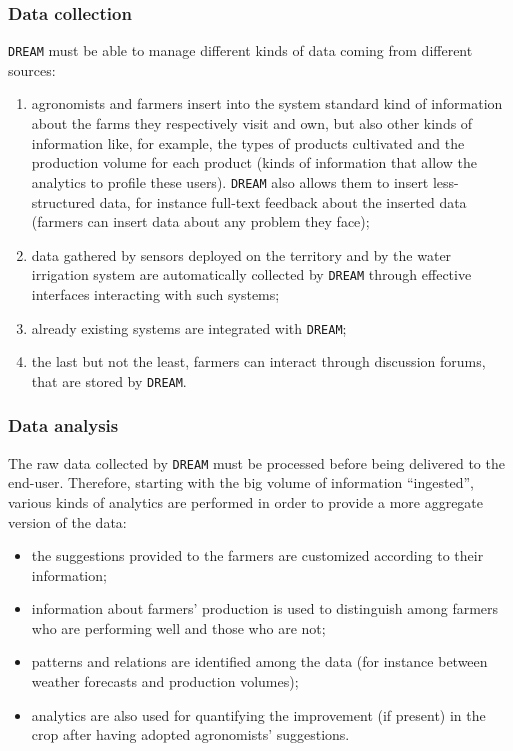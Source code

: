 \documentclass{article}
\begin{document}
\subsubsection{Data collection}
\verb |DREAM| must be able to manage different kinds of data coming from different sources:
\begin{enumerate}
\item agronomists and farmers insert into the system standard kind of information about the farms they 
respectively visit and own, but also other kinds of information like, for example, the types of products 
cultivated and the production volume for each product (kinds of information that allow the analytics to 
profile these users). \verb |DREAM| also allows them to insert less-structured data, for instance full-text feedback 
about the inserted data (farmers can insert data about any problem they face);
\item data gathered by sensors deployed on the territory and by the water irrigation system are automatically 
collected by \verb|DREAM| through effective interfaces interacting with such systems;
\item already existing systems are integrated with \verb|DREAM|;
\item the last but not the least, farmers can interact through discussion forums, that are stored by \verb|DREAM|.
\end{enumerate}
\subsubsection{Data analysis}
The raw data collected by \verb|DREAM| must be processed before being delivered to the end-user. Therefore, 
starting with the big volume of information “ingested”, various kinds of analytics are performed in order to 
provide a more aggregate version of the data:
\begin{itemize}
\item the suggestions provided to the farmers are customized according to their information;
\item information about farmers’ production is used to distinguish among farmers who are performing well 
and those who are not;%
\item  patterns and relations are identified among the data (for instance between weather 
forecasts and production volumes);
\item analytics are also used for quantifying the improvement (if present) in the crop after having adopted agronomists’ suggestions.
\end{itemize}
\end{document}
